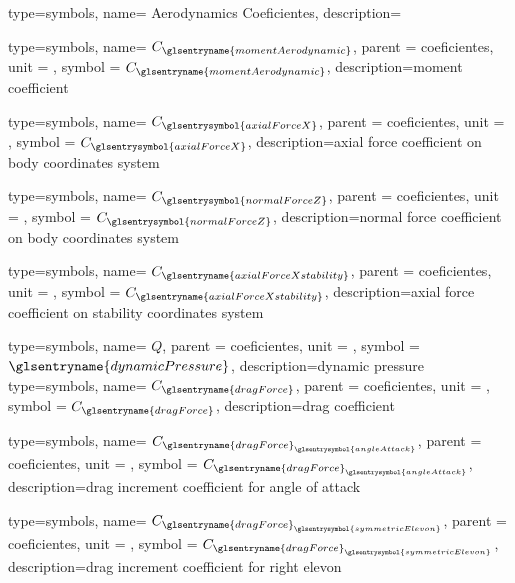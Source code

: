 {type=symbols,
    name= {Aerodynamics Coeficientes},
    description={}
}

{type=symbols,
    name= \ensuremath{C_{\glsentryname{momentAerodynamic}}},
    parent = {coeficientes},
    unit = \unexpanded{},
    symbol = \ensuremath{C_{\glsentryname{momentAerodynamic}}},
    description={moment coefficient}
}

{type=symbols,
    name= \ensuremath{C_{\glsentrysymbol{axialForceX}}},
    parent = {coeficientes},
    unit = \unexpanded{},
    symbol = \ensuremath{C_{\glsentrysymbol{axialForceX}}},
    description={axial force coefficient on body coordinates system }
}

{type=symbols,
    name= \ensuremath{C_{\glsentrysymbol{normalForceZ}}},
    parent = {coeficientes},
    unit = \unexpanded{},
    symbol = \ensuremath{C_{\glsentrysymbol{normalForceZ}}},
    description={normal force coefficient on body coordinates system }
}

{type=symbols,
    name= \ensuremath{C_{\glsentryname{axialForceXstability}}},
    parent = {coeficientes},
    unit = \unexpanded{},
    symbol = \ensuremath{C_{\glsentryname{axialForceXstability}}},
    description={axial force coefficient on stability coordinates system }
}


{type=symbols,
    name= \ensuremath{Q},
    parent = {coeficientes},
    unit = \unexpanded{\si{\newton\per\cubic\meter}},
    symbol = \ensuremath{\glsentryname{dynamicPressure}},
    description={dynamic pressure}
}
{type=symbols,
    name= \ensuremath{C_{\glsentryname{dragForce}}},
    parent = {coeficientes},
    unit = \unexpanded{},
    symbol = \ensuremath{C_{\glsentryname{dragForce}}},
    description={drag coefficient}
}

{type=symbols,
    name= \ensuremath{C_{{\glsentryname{dragForce}}_{\glsentrysymbol{angleAttack}}}},
    parent = {coeficientes},
    unit = \unexpanded{},
    symbol = \ensuremath{C_{{\glsentryname{dragForce}}_{\glsentrysymbol{angleAttack}}}},
    description={drag increment coefficient for angle of attack}
}

{type=symbols,
    name= \ensuremath{C_{{\glsentryname{dragForce}}_{\glsentrysymbol{symmetricElevon}}}},
    parent = {coeficientes},
    unit = \unexpanded{},
    symbol = \ensuremath{C_{{\glsentryname{dragForce}}_{\glsentrysymbol{symmetricElevon}}}},
    description={drag increment coefficient for right elevon}
}

